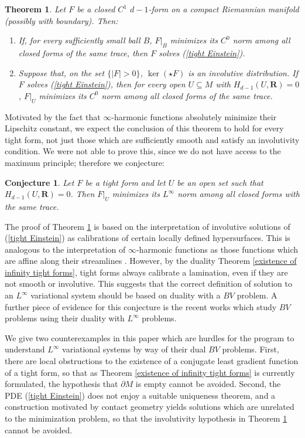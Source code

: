 \documentclass[reqno,11pt]{amsart}
\newcommand{\RR}{\mathbf{R}}
\newtheorem{conjecture}[theorem]{Conjecture}
\newtheorem{mainthm}{Theorem}
\theoremstyle{definition}
\numberwithin{equation}{section}
\begin{document}
\begin{mainthm}\label{tight are absolute minimizers}
Let $F$ be a closed $C^1$ $d - 1$-form on a compact Riemannian manifold (possibly with boundary). Then:
\begin{enumerate}
\item If, for every sufficiently small ball $B$, $F|_B$ minimizes its $C^0$ norm among all closed forms of the same trace, then $F$ solves (\ref{tight Einstein}).
\item Suppose that, on the set $\{|F| > 0\}$, $\ker(\star F)$ is an involutive distribution.
If $F$ solves (\ref{tight Einstein}), then for every open $U \subseteq M$ with $H_{d - 1}(U, \RR) = 0$, $F|_U$ minimizes its $C^0$ norm among all closed forms of the same trace.
\end{enumerate}
\end{mainthm}

Motivated by the fact that $\infty$-harmonic functions absolutely minimize their Lipschitz constant, we expect the conclusion of this theorem to hold for every tight form, not just those which are sufficiently smooth and satisfy an involutivity condition.
We were not able to prove this, since we do not have access to the maximum principle; therefore we conjecture:

\begin{conjecture}
Let $F$ be a tight form and let $U$ be an open set such that $H_{d - 1}(U, \RR) = 0$.
Then $F|_U$ minimizes its $L^\infty$ norm among all closed forms with the same trace.
\end{conjecture}

The proof of Theorem \ref{tight are absolute minimizers} is based on the interpretation of involutive solutions of (\ref{tight Einstein}) as calibrations of certain locally defined hypersurfaces.
This is analogous to the interpretation of $\infty$-harmonic functions as those functions which are affine along their streamlines \cite{Aronsson68}.
However, by the duality Theorem \ref{existence of infinity tight forms}, tight forms always calibrate a lamination, even if they are not smooth or involutive.
This suggests that the correct definition of solution to an $L^\infty$ variational system should be based on duality with a $BV$ problem.
A further piece of evidence for this conjecture is the recent works \cite{Mazon14,górny2021applications,górny2022dualitybased} which study $BV$ problems using their duality with $L^\infty$ problems.

We give two counterexamples in this paper which are hurdles for the program to understand $L^\infty$ variational systems by way of their dual $BV$ problems.
First, there are local obstructions to the existence of a conjugate least gradient function of a tight form, so that as Theorem \ref{existence of infinity tight forms} is currently formulated, the hypothesis that $\partial M$ is empty cannot be avoided.
Second, the PDE (\ref{tight Einstein}) does not enjoy a suitable uniqueness theorem, and a construction motivated by contact geometry yields solutions which are unrelated to the minimization problem, so that the involutivity hypothesis in Theorem \ref{tight are absolute minimizers} cannot be avoided.
\end{document}
